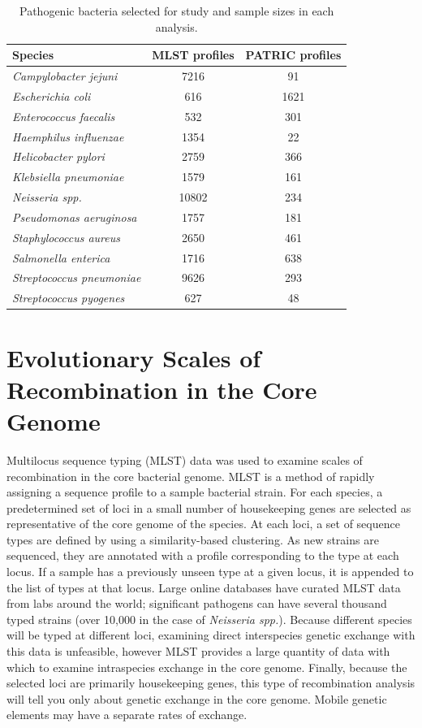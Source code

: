 \begin{table}
\centering
\caption[List of pathogenic bacteria selected for study]{Pathogenic bacteria selected for study and sample sizes in each analysis.}
\begin{tabularx}{\textwidth}{Xcc}
\toprule
Species & \hspace{10mm}MLST profiles\hspace{10mm} & PATRIC profiles \\
\midrule
\emph{Campylobacter jejuni}      & 7216  & 91 \\
\emph{Escherichia coli}          & 616   & 1621 \\
\emph{Enterococcus faecalis}     & 532   & 301 \\
\emph{Haemphilus influenzae}     & 1354  & 22 \\
\emph{Helicobacter pylori}       & 2759  & 366 \\
\emph{Klebsiella pneumoniae}     & 1579  & 161 \\
\emph{Neisseria spp.}            & 10802 & 234 \\
\emph{Pseudomonas aeruginosa}    & 1757  & 181 \\
\emph{Staphylococcus aureus}     & 2650  & 461 \\
\emph{Salmonella enterica}       & 1716  & 638 \\
\emph{Streptococcus pneumoniae}  & 9626  & 293 \\
\emph{Streptococcus pyogenes}    & 627   & 48 \\
\bottomrule
\end{tabularx}
\label{table:samplesizes}
\end{table}

\section{Evolutionary Scales of Recombination in the Core Genome}
\label{pathogens:mlst}
%
Multilocus sequence typing (MLST) data was used to examine scales of recombination in the core bacterial genome.
MLST is a method of rapidly assigning a sequence profile to a sample bacterial strain.
For each species, a predetermined set of loci in a small number of housekeeping genes are selected as representative of the core genome of the species.
At each loci, a set of sequence types are defined by using a similarity-based clustering.
As new strains are sequenced, they are annotated with a profile corresponding to the type at each locus.
If a sample has a previously unseen type at a given locus, it is appended to the list of types at that locus.
Large online databases have curated MLST data from labs around the world; significant pathogens can have several thousand typed strains (over 10,000 in the case of \emph{Neisseria spp.}).
Because different species will be typed at different loci, examining direct interspecies genetic exchange with this data is unfeasible, however MLST provides a large quantity of data with which to examine intraspecies exchange in the core genome.
Finally, because the selected loci are primarily housekeeping genes, this type of recombination analysis will tell you only about genetic exchange in the core genome.
Mobile genetic elements may have a separate rates of exchange.


